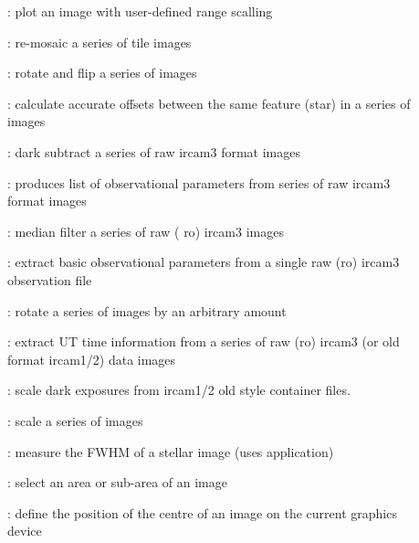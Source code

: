 \begin{description}
\begin{description}
\item []: plot an image with user-defined
range scalling

\item []: re-mosaic a series of tile images

\item []: rotate and flip a series of images

\item []: calculate accurate offsets between
the same feature (star) in a series of images

\item []: dark subtract a series of raw
{\sc ircam3} format images

\item []: produces list of observational
parameters from  series of raw {\sc ircam3} format images

\item []: median filter a series of raw ({\sc
ro}) {\sc ircam3} images

\item []: extract basic observational parameters
from a single raw ({\sc ro}) {\sc ircam3} observation file

\item []: rotate a series of images by an
arbitrary amount

\item []: extract UT time information from a series
of raw ({\sc ro}) {\sc ircam3} (or old format {\sc ircam1/2}) data
images

\item []: scale dark exposures from {\sc
ircam1/2} old style container files.

\item []: scale a series of images

\item []: measure the FWHM of a stellar image (uses
  application)

\item []: select an area or sub-area of an image

\item []: define the position of the centre of
an image on the current graphics device


\end{description}
\end{description}
